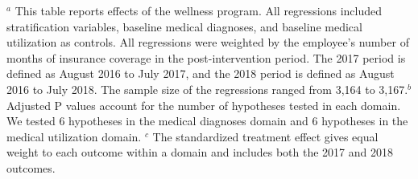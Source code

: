 \documentclass{article}
\begin{document}
\begin{table}[tbp]
{\begin{tabularx}{\linewidth}{lCClCC}
\end{tabularx}
\begin{flushleft}
\tiny $^{a}$ This table reports effects of the wellness program. All regressions included stratification variables, baseline medical diagnoses, and baseline medical utilization as controls. All regressions were weighted by the employee's number of months of insurance coverage in the post-intervention period. The 2017 period is defined as August 2016 to July 2017, and the 2018 period is defined as August 2016 to July 2018. The sample size of the regressions ranged from 3,164 to 3,167.\newline $^{b}$ Adjusted P values account for the number of hypotheses tested in each domain. We tested 6 hypotheses in the medical diagnoses domain and 6 hypotheses in the medical utilization domain. \newline $^{c}$ The standardized treatment effect gives equal weight to each outcome within a domain and includes both the 2017 and 2018 outcomes.
\end{flushleft}
}
\end{table}
\end{document}
